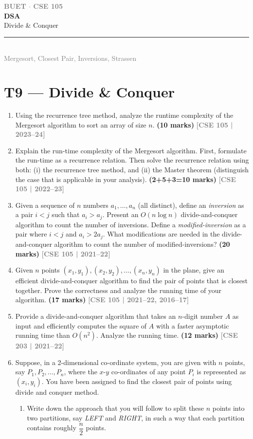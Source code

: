 \documentclass[12pt,a3paper]{article}
\newcommand{\yr}[1]{\hfill\textcolor{gray}{\small\textbf{[#1]}}}
\newcommand{\mk}[1]{\textcolor{orange!70!black}{\small\textbf{(#1 marks)}}}
\newcommand{\secdivider}[4]{%
  \newpage\thispagestyle{empty}%
  \vspace*{\fill}%
  \begin{tcolorbox}[enhanced,colback=#4!7,colframe=#3,boxrule=1.5pt,arc=8pt,
    left=20pt,right=20pt,top=22pt,bottom=22pt,
    shadow={3pt}{-3pt}{0pt}{black!15}]
    \centering
    {\large\textcolor{gray}{\textbf{BUET $\cdot$ CSE 105}}}\\[8pt]
    {\fontsize{26}{32}\selectfont\bfseries\textcolor{#3}{DSA}}\\[6pt]
    {\fontsize{15}{19}\selectfont\textcolor{dgray}{#1}}\\[12pt]
    \textcolor{#3!60}{\rule{0.5\textwidth}{0.5pt}}\\[6pt]
    {\small\textcolor{gray}{#2}}
  \end{tcolorbox}%
  \vspace*{\fill}\newpage%
}
\begin{document}
\secdivider{Divide \& Conquer}{Mergesort, Closest Pair, Inversions, Strassen}{cB}{cB}
\label{sec:T9}
\section{T9 --- Divide \& Conquer}

\begin{enumerate}
\item Using the recurrence tree method, analyze the runtime complexity of the Mergesort algorithm to sort an array of size $n$. \mk{10}
\yr{CSE 105 | 2023--24}

\item Explain the run-time complexity of the Mergesort algorithm. First, formulate the run-time as a recurrence relation. Then solve the recurrence relation using both: (i) the recurrence tree method, and (ii) the Master theorem (distinguish the case that is applicable in your analysis). \mk{2+5+3=10}
\yr{CSE 105 | 2022--23}

\item Given a sequence of $n$ numbers $a_1, \ldots, a_n$ (all distinct), define an \textit{inversion} as a pair $i < j$ such that $a_i > a_j$. Present an $O(n \log n)$ divide-and-conquer algorithm to count the number of inversions. Define a \textit{modified-inversion} as a pair where $i < j$ and $a_i > 2a_j$. What modifications are needed in the divide-and-conquer algorithm to count the number of modified-inversions? \mk{20}
\yr{CSE 105 | 2021--22}

\item Given $n$ points $(x_1, y_1), (x_2, y_2), \ldots, (x_n, y_n)$ in the plane, give an efficient divide-and-conquer algorithm to find the pair of points that is closest together. Prove the correctness and analyze the running time of your algorithm. \mk{17}
\yr{CSE 105 | 2021--22, 2016--17}

\item Provide a divide-and-conquer algorithm that takes an $n$-digit number $A$ as input and efficiently computes the square of $A$ with a faster asymptotic running time than $O(n^2)$. Analyze the running time. \mk{12}
\yr{CSE 203 | 2021--22}

\item Suppose, in a 2-dimensional co-ordinate system, you are given with $n$
points, say $P_1, P_2, \ldots, P_n$, where the $x$-$y$ co-ordinates of any
point $P_i$ is represented as $(x_i, y_i)$. You have been assigned to find the
closest pair of points using divide and conquer method.
\begin{enumerate}[label=(\roman*)]
  \item Write down the approach that you will follow to split these $n$ points
  into two partitions, say \textit{LEFT} and \textit{RIGHT}, in such a way that
  each partition contains roughly $\dfrac{n}{2}$ points.


\end{enumerate}
\end{enumerate}
\end{document}
